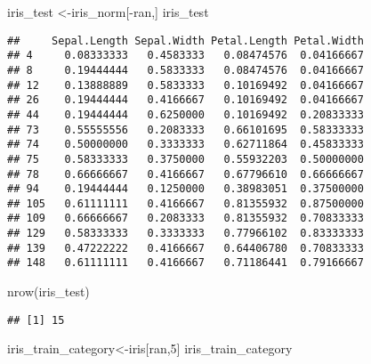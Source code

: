 \documentclass[
]{article}
\newenvironment{Shaded}{\begin{snugshade}}{\end{snugshade}}
\newcommand{\DecValTok}[1]{\textcolor[rgb]{0.00,0.00,0.81}{#1}}
\newcommand{\FunctionTok}[1]{\textcolor[rgb]{0.00,0.00,0.00}{#1}}
\newcommand{\NormalTok}[1]{#1}
\newcommand{\OtherTok}[1]{\textcolor[rgb]{0.56,0.35,0.01}{#1}}
\newcommand{\SpecialCharTok}[1]{\textcolor[rgb]{0.00,0.00,0.00}{#1}}
\begin{document}
\begin{Shaded}
\begin{Highlighting}[]
\NormalTok{iris\_test }\OtherTok{\textless{}{-}}\NormalTok{iris\_norm[}\SpecialCharTok{{-}}\NormalTok{ran,]}
\NormalTok{iris\_test}
\end{Highlighting}
\end{Shaded}

\begin{verbatim}
##     Sepal.Length Sepal.Width Petal.Length Petal.Width
## 4     0.08333333   0.4583333   0.08474576  0.04166667
## 8     0.19444444   0.5833333   0.08474576  0.04166667
## 12    0.13888889   0.5833333   0.10169492  0.04166667
## 26    0.19444444   0.4166667   0.10169492  0.04166667
## 44    0.19444444   0.6250000   0.10169492  0.20833333
## 73    0.55555556   0.2083333   0.66101695  0.58333333
## 74    0.50000000   0.3333333   0.62711864  0.45833333
## 75    0.58333333   0.3750000   0.55932203  0.50000000
## 78    0.66666667   0.4166667   0.67796610  0.66666667
## 94    0.19444444   0.1250000   0.38983051  0.37500000
## 105   0.61111111   0.4166667   0.81355932  0.87500000
## 109   0.66666667   0.2083333   0.81355932  0.70833333
## 129   0.58333333   0.3333333   0.77966102  0.83333333
## 139   0.47222222   0.4166667   0.64406780  0.70833333
## 148   0.61111111   0.4166667   0.71186441  0.79166667
\end{verbatim}

\begin{Shaded}
\begin{Highlighting}[]
\FunctionTok{nrow}\NormalTok{(iris\_test)}
\end{Highlighting}
\end{Shaded}

\begin{verbatim}
## [1] 15
\end{verbatim}

\begin{Shaded}
\begin{Highlighting}[]
\NormalTok{iris\_train\_category}\OtherTok{\textless{}{-}}\NormalTok{iris[ran,}\DecValTok{5}\NormalTok{]}
\NormalTok{iris\_train\_category}
\end{Highlighting}
\end{Shaded}
\end{document}
